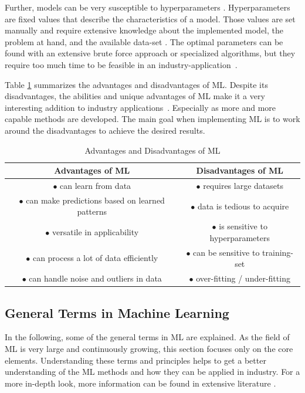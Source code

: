 Further, models can be very susceptible to hyperparameters \cite{Janiesch}. Hyperparameters are fixed values that describe the characteristics of a model. Those values are set manually and require extensive knowledge about the implemented model, the problem at hand, and the available data-set \cite{Luo}. The optimal parameters can be found with an extensive brute force approach or specialized algorithms, but they require too much time to be feasible in an industry-application~\cite{Claesen}. 

Table \ref{AdDis} summarizes the advantages and disadvantages of ML. Despite its disadvantages, the abilities and unique advantages of ML make it a very interesting addition to industry applications~\cite{Bertolini}. Especially as more and more capable methods are developed. The main goal when implementing ML is to work around the disadvantages to achieve the desired results.


\begin{table}
	\begin{center}
	\begin{tabular}{|| c | c ||}
		\hline
		\rule{0pt}{2ex}
		 Advantages of ML & Disadvantages of ML \\
		\hline
				\rule{0pt}{2ex} 
		$\bullet$ can learn from data & $\bullet$ requires large datasets \\
		$\bullet$ can make predictions based on learned patterns & $\bullet$ data is tedious to acquire\\	
		$\bullet$ versatile in applicability & $\bullet$ is sensitive to hyperparameters\\
		$\bullet$ can process a lot of data efficiently & $\bullet$ can be sensitive to training-set\\
		$\bullet$ can handle noise and outliers in data & $\bullet$ over-fitting / under-fitting\\
		\hline
	\end{tabular}
	\caption{Advantages and Disadvantages of ML}
	\label{AdDis}
\end{center}
\vspace{-4mm}
\end{table}
\newpage
\subsection{General Terms in Machine Learning}
In the following, some of the general terms in ML are explained. As the field of ML is very large and continuously growing, this section focuses only on the core elements. Understanding these terms and principles helps to get a better understanding of the ML methods and how they can be applied in industry. For a more in-depth look, more information can be found in extensive literature \cite{Theodoridis, Bishop, google}.

